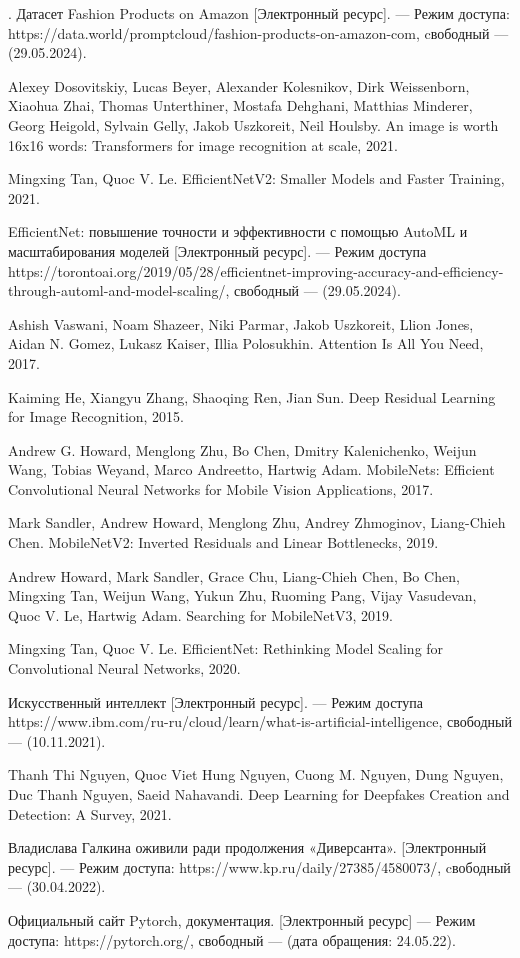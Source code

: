 \begin{thebibliography}{0}
	. Датасет Fashion Products on Amazon [Электронный ресурс]. — Режим доступа: https://data.world/promptcloud/fashion-products-on-amazon-com, cвободный — (29.05.2024).
	
	Alexey Dosovitskiy, Lucas Beyer, Alexander Kolesnikov, Dirk Weissenborn, Xiaohua Zhai, Thomas Unterthiner, Mostafa Dehghani, Matthias Minderer,
	Georg Heigold, Sylvain Gelly, Jakob Uszkoreit, Neil Houlsby. An image is worth 16x16 words: Transformers for image recognition at scale, 2021.
	
	Mingxing Tan, Quoc V. Le. EfficientNetV2: Smaller Models and Faster Training, 2021.
	
	EfficientNet: повышение точности и эффективности с помощью AutoML и масштабирования моделей [Электронный ресурс]. — Режим доступа https://torontoai.org/2019/05/28/efficientnet-improving-accuracy-and-efficiency-through-automl-and-model-scaling/, свободный — (29.05.2024).
	
	
	Ashish Vaswani, Noam Shazeer, Niki Parmar, Jakob Uszkoreit, Llion Jones, Aidan N. Gomez, Lukasz Kaiser, Illia Polosukhin. Attention Is All You Need, 2017.
	
	Kaiming He, Xiangyu Zhang, Shaoqing Ren, Jian Sun. Deep Residual Learning for Image Recognition, 2015.
	
	Andrew G. Howard, Menglong Zhu, Bo Chen, Dmitry Kalenichenko, Weijun Wang, Tobias Weyand, Marco Andreetto, Hartwig Adam. MobileNets: Efficient Convolutional Neural Networks for Mobile Vision Applications, 2017.
	
	Mark Sandler, Andrew Howard, Menglong Zhu, Andrey Zhmoginov, Liang-Chieh Chen. MobileNetV2: Inverted Residuals and Linear Bottlenecks, 2019.
	
	Andrew Howard, Mark Sandler, Grace Chu, Liang-Chieh Chen, Bo Chen, Mingxing Tan,
	Weijun Wang, Yukun Zhu, Ruoming Pang, Vijay Vasudevan, Quoc V. Le, Hartwig Adam. Searching for MobileNetV3, 2019.
	
	Mingxing Tan, Quoc V. Le. EfficientNet: Rethinking Model Scaling for Convolutional Neural Networks, 2020.
	
	Искусственный интеллект [Электронный ресурс]. — Режим доступа https://www.ibm.com/ru-ru/cloud/learn/what-is-artificial-intelligence, свободный — (10.11.2021).
	
	Thanh Thi Nguyen, Quoc Viet Hung Nguyen, Cuong M. Nguyen, Dung Nguyen, Duc Thanh Nguyen, Saeid Nahavandi. Deep Learning for Deepfakes Creation and
	Detection: A Survey, 2021.
	
	 Владислава Галкина оживили ради продолжения «Диверсанта». [Электронный ресурс]. — Режим доступа: https://www.kp.ru/daily/27385/4580073/, cвободный — (30.04.2022).
	
	 Официальный сайт Pytorch, документация. [Электронный ресурс] — Режим доступа: https://pytorch.org/, свободный — (дата обращения: 24.05.22).
	
\end{thebibliography}
